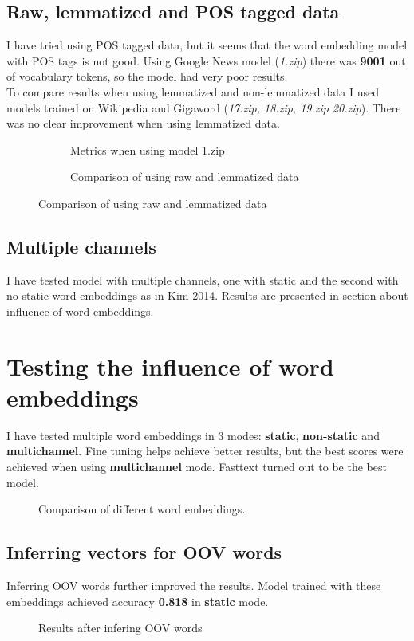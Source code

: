 \documentclass{article}
\begin{document}
\subsection{Raw, lemmatized and POS tagged data}
I have tried using POS tagged data, but it seems that the word embedding model with
POS tags is not good. Using Google News model (\textit{1.zip}) there was \textbf{9001} out of vocabulary tokens,
so the model had very poor results.\\
To compare results when using lemmatized and non-lemmatized data I used models trained on Wikipedia and Gigaword
(\textit{17.zip, 18.zip, 19.zip 20.zip}). There was no clear improvement when using lemmatized data. 


\begin{figure}[h]
    \begin{subfigure}{0.5\textwidth}
        \centering
        
        \caption{Metrics when using model 1.zip}
    \end{subfigure}
    \begin{subfigure}{0.5\textwidth}
        \centering
        
        \caption{Comparison of using raw and lemmatized data}
    \end{subfigure}
\end{figure}

\subsection{Multiple channels}
I have tested model with multiple channels, one with static and the second with
no-static word embeddings as in Kim 2014. Results are presented in section about
influence of word embeddings.

\newpage
\section{Testing the influence of word embeddings}
I have tested multiple word embeddings in 3 modes: \textbf{static}, \textbf{non-static} and \textbf{multichannel}.
Fine tuning helps achieve better results, but the best scores were achieved when using \textbf{multichannel} mode.
Fasttext turned out to be the best model.
\begin{figure}[h]
    \centering
    
    \caption{Comparison of different word embeddings.}
\end{figure}
\subsection{Inferring vectors for OOV words}
Inferring OOV words further improved the results. Model trained with these embeddings achieved
accuracy \textbf{0.818} in \textbf{static} mode.
\begin{figure}[h]
    \centering
    
    \caption{Results after infering OOV words}
\end{figure}
\end{document}
